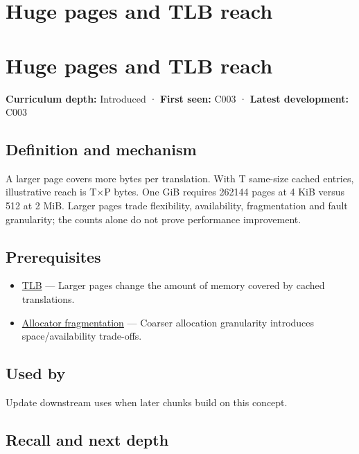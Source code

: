 \hypertarget{appendix-ce688d1acdab}{}
\section*{Huge pages and TLB reach}
\section{Huge pages and TLB reach}\label{appendix-ce688d1acdab-huge-pages-and-tlb-reach}

\textbf{Curriculum depth:} Introduced · \textbf{First seen:} C003 · \textbf{Latest development:} C003

\subsection{Definition and mechanism}\label{appendix-ce688d1acdab-definition-and-mechanism}

A larger page covers more bytes per translation. With T same-size cached entries, illustrative reach is T×P bytes. One GiB requires 262144 pages at 4 KiB versus 512 at 2 MiB. Larger pages trade flexibility, availability, fragmentation and fault granularity; the counts alone do not prove performance improvement.

\subsection{Prerequisites}\label{appendix-ce688d1acdab-prerequisites}

\begin{itemize}
\tightlist
\item
  \hyperref[appendix-7a2d9c5ce511]{TLB} --- Larger pages change the amount of memory covered by cached translations.
\item
  \hyperref[appendix-a7c50686d81f]{Allocator fragmentation} --- Coarser allocation granularity introduces space/availability trade-offs.
\end{itemize}

\subsection{Used by}\label{appendix-ce688d1acdab-used-by}

Update downstream uses when later chunks build on this concept.

\subsection{Recall and next depth}\label{appendix-ce688d1acdab-recall-and-next-depth}

